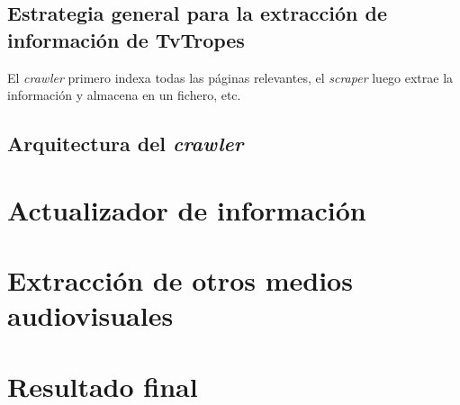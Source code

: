 \subsection{Estrategia general para la extracción de información de TvTropes}
El \textit{crawler} primero indexa todas las páginas relevantes, el
\textit{scraper} luego extrae la información y almacena en un fichero, etc.

\subsection{Arquitectura del \textit{crawler}}

\section{Actualizador de información}
\section{Extracción de otros medios audiovisuales}
\section{Resultado final}